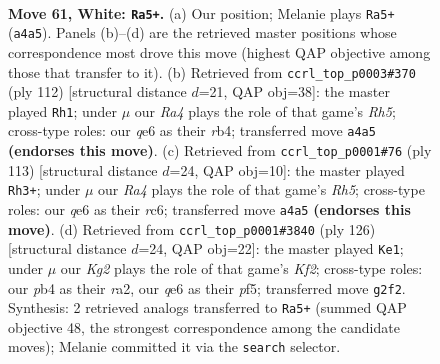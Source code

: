 \documentclass[11pt]{article}
\begin{document}
\clearpage

\begin{figure}[p]\centering
\begin{subfigure}{0.46\textwidth}\centering
\resizebox{\linewidth}{!}{%
\newchessgame
\chessboard[
  setfen={8/8/4q3/4k3/Rp6/b4B2/6K1/8 w - - 12 61},
  showmover=false,
  pgfstyle=straightmove, color=movearrow, markmove={a4-a5}
]}
\caption{}
\end{subfigure}\hfill
\begin{subfigure}{0.46\textwidth}\centering
\resizebox{\linewidth}{!}{%
\newchessgame
\chessboard[
  setfen={8/3B4/5k1p/6bR/1r6/8/6K1/8 w - - 5 57},
  showmover=false,
  pgfstyle=straightmove, color=movearrow, markmove={h5-h1}
]}
\caption{}
\end{subfigure}
\\[4pt]
\begin{subfigure}{0.46\textwidth}\centering
\resizebox{\linewidth}{!}{%
\newchessgame
\chessboard[
  setfen={5k2/8/2R4P/4b3/4B2r/3K4/8/8 b - - 2 57},
  showmover=false,
  pgfstyle=straightmove, color=movearrow, markmove={h4-h3}
]}
\caption{}
\end{subfigure}\hfill
\begin{subfigure}{0.46\textwidth}\centering
\resizebox{\linewidth}{!}{%
\newchessgame
\chessboard[
  setfen={8/8/8/5p2/5k2/2R5/r1b1BK2/8 w - - 12 64},
  showmover=false,
  pgfstyle=straightmove, color=movearrow, markmove={f2-e1}
]}
\caption{}
\end{subfigure}
\caption{\textbf{Move 61, White: \texttt{Ra5+}.} (a) Our position; Melanie plays \texttt{Ra5+} (\texttt{a4a5}). Panels (b)--(d) are the retrieved master positions whose correspondence most drove this move (highest QAP objective among those that transfer to it). (b) Retrieved from \texttt{ccrl\_top\_p0003\#370} (ply 112) [structural distance $d$=21, QAP obj=38]: the master played \texttt{Rh1}; under $\mu$ our \emph{Ra4} plays the role of that game's \emph{Rh5}; cross-type roles: our \emph{q}e6 as their \emph{r}b4; transferred move \texttt{a4a5} \textbf{(endorses this move)}. (c) Retrieved from \texttt{ccrl\_top\_p0001\#76} (ply 113) [structural distance $d$=24, QAP obj=10]: the master played \texttt{Rh3+}; under $\mu$ our \emph{Ra4} plays the role of that game's \emph{Rh5}; cross-type roles: our \emph{q}e6 as their \emph{r}c6; transferred move \texttt{a4a5} \textbf{(endorses this move)}. (d) Retrieved from \texttt{ccrl\_top\_p0001\#3840} (ply 126) [structural distance $d$=24, QAP obj=22]: the master played \texttt{Ke1}; under $\mu$ our \emph{Kg2} plays the role of that game's \emph{Kf2}; cross-type roles: our \emph{p}b4 as their \emph{r}a2, our \emph{q}e6 as their \emph{p}f5; transferred move \texttt{g2f2}. Synthesis: 2 retrieved analogs transferred to \texttt{Ra5+} (summed QAP objective 48, the strongest correspondence among the candidate moves); Melanie committed it via the \texttt{search} selector.}
\label{fig:thought-m120}
\end{figure}
\end{document}
